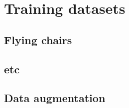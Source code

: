 
\section{Training datasets}
\subsection{Flying chairs}
\subsection{etc}

\subsection{Data augmentation}
